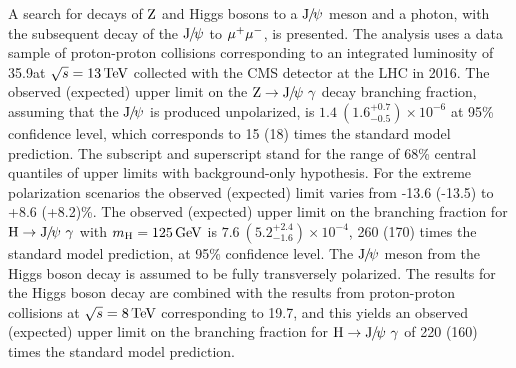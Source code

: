 % 
% 
%
A search for decays of $\mathrm{Z}$ and Higgs bosons to a ${\mathrm{J}\hspace{-.08em}/\hspace{-.14em}\psi}$ meson and a photon, with the subsequent decay of the ${\mathrm{J}\hspace{-.08em}/\hspace{-.14em}\psi}$ to $\mu^{+}\mu^{-}$, is presented. The analysis uses a data sample of proton-proton collisions corresponding to an integrated luminosity of 35.9\fbinv at $\sqrt{s}=13\,\text{Te\hspace{-.08em}V}$ collected with the CMS detector at the LHC in 2016. The observed (expected) upper limit on the $\cPZ\to\JPsi\ \gamma$ decay branching fraction, assuming that the ${\mathrm{J}\hspace{-.08em}/\hspace{-.14em}\psi}$ is produced unpolarized, is $1.4\ (1.6^{+0.7}_{-0.5})\times10^{-6}$ at 95\% confidence level, which corresponds to 15 (18) times the standard model prediction. The subscript and superscript stand for the range of 68\% central quantiles of upper limits with background-only hypothesis. For the extreme polarization scenarios the observed (expected) limit varies from -13.6 (-13.5) to +8.6 (+8.2)\%. The observed (expected) upper limit on the branching fraction for $\mathrm{H}\to{\mathrm{J}\hspace{-.08em}/\hspace{-.14em}\psi}\ \gamma$ with $m_{\mathrm{H}} = 125\,\text{Ge\hspace{-.08em}V}$ is $7.6\ (5.2^{+2.4}_{-1.6})\times 10^{-4}$, 260 (170) times the standard model prediction, at 95\% confidence level. The ${\mathrm{J}\hspace{-.08em}/\hspace{-.14em}\psi}$ meson from the Higgs boson decay is assumed to be fully transversely polarized. The results for the Higgs boson decay are combined with the results from proton-proton collisions at $\sqrt{s}=8\,\text{Te\hspace{-.08em}V}$ corresponding to 19.7\fbinv, and this yields an observed (expected) upper limit on the branching fraction for $\mathrm{H}\to{\mathrm{J}\hspace{-.08em}/\hspace{-.14em}\psi}\ \gamma$ of 220 (160) times the standard model prediction.